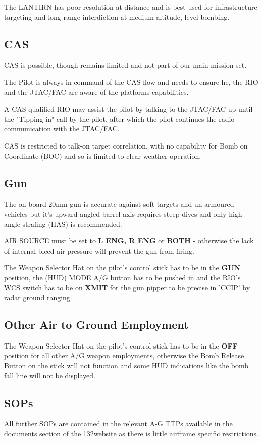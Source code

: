 The LANTIRN has poor resolution at distance and is best used for infrastructure
targeting and long-range interdiction at medium altitude, level bombing.

\subsection{CAS}

CAS is possible, though remains limited and not part of our main mission set.

The Pilot is always in command of the CAS flow and needs to ensure he, the RIO
and the JTAC/FAC are aware of the platforms capabilities.

A CAS qualified RIO may assist the pilot by talking to the JTAC/FAC up until
the "Tipping in" call by the pilot, after which the pilot continues the radio
communication with the JTAC/FAC.

CAS is restricted to talk-on target correlation, with no capability for Bomb on
Coordinate (BOC) and so is limited to clear weather operation.

\newpage

\subsection{Gun}

The on board 20mm gun is accurate against soft targets and un-armoured vehicles
but it's upward-angled barrel axis requires steep dives and only high-angle
strafing (HAS) is recommended.

AIR SOURCE must be set to \textbf{L ENG, R ENG} or \textbf{BOTH} - otherwise
the lack of internal bleed air pressure will prevent the gun from firing.

The Weapon Selector Hat on the pilot's control stick has to be in the
\textbf{GUN} position, the (HUD) MODE A/G button has to be pushed in and the
RIO's WCS switch has to be on \textbf{XMIT} for the gun pipper to be precise in
'CCIP' by radar ground ranging.

\subsection{Other Air to Ground Employment}

The Weapon Selector Hat on the pilot's control stick has to be in the
\textbf{OFF} position for all other A/G weapon employments, otherwise the Bomb
Release Button on the stick will not function and some HUD indications like the
bomb fall line will not be displayed.

\subsection{SOPs}

All further SOPs are contained in the relevant A-G TTPs available in the
documents section of the 132\nd website as there is little airframe specific
restrictions.
